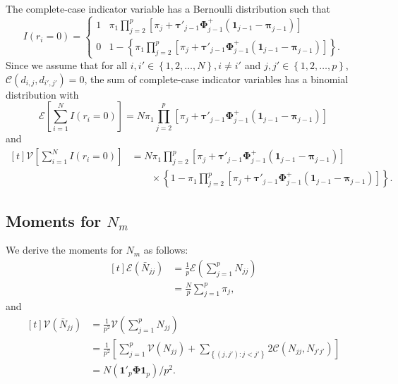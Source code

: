\documentclass[11pt]{article}
\begin{document}
The complete-case indicator variable has a Bernoulli distribution such that
\begin{equation}
I\left(r_{i}=0\right)=
\begin{cases}
1&\pi_{1}\prod_{j=2}^{p}\left[\pi_{j}+\boldsymbol{\tau}'_{j-1}\boldsymbol{\Phi}^{+}_{j-1}\left(\boldsymbol{1}_{j-1}-\boldsymbol{\pi}_{j-1}\right)\right]\\
0&1-\left\{\pi_{1}\prod_{j=2}^{p}\left[\pi_{j}+\boldsymbol{\tau}'_{j-1}\boldsymbol{\Phi}^{+}_{j-1}\left(\boldsymbol{1}_{j-1}-\boldsymbol{\pi}_{j-1}\right)\right]\right\}.
\end{cases}
\end{equation}
Since we assume that for all $i,i'\in\left\{1,2,\ldots,N\right\},i\neq i'$ and $j,j'\in\left\{1,2,\ldots,p\right\}$, $\mathcal{C}\left(d_{i,j},d_{i',j'}\right)=0$, the sum of complete-case indicator variables has a binomial distribution with 
\begin{equation}
\mathcal{E}\left[\sum_{i=1}^{N}I\left(r_{i}=0\right)\right]=N\pi_{1}\prod_{j=2}^{p}\left[\pi_{j}+\boldsymbol{\tau}'_{j-1}\boldsymbol{\Phi}^{+}_{j-1}\left(\boldsymbol{1}_{j-1}-\boldsymbol{\pi}_{j-1}\right)\right]
\end{equation}
and
\begin{equation}
\begin{aligned}[t]
\mathcal{V}\left[\sum_{i=1}^{N}I\left(r_{i}=0\right)\right]&=N\pi_{1}\prod_{j=2}^{p}\left[\pi_{j}+\boldsymbol{\tau}'_{j-1}\boldsymbol{\Phi}^{+}_{j-1}\left(\boldsymbol{1}_{j-1}-\boldsymbol{\pi}_{j-1}\right)\right]\\
&\qquad\times\left\{1-\pi_{1}\prod_{j=2}^{p}\left[\pi_{j}+\boldsymbol{\tau}'_{j-1}\boldsymbol{\Phi}^{+}_{j-1}\left(\boldsymbol{1}_{j-1}-\boldsymbol{\pi}_{j-1}\right)\right]\right\}.
\end{aligned}
\end{equation}

\subsection{Moments for $N_m$}

We derive the moments for $N_{m}$ as follows:
\begin{equation}
\begin{aligned}[t]
\mathcal{E}(\bar{N}_{jj})&=\frac{1}{p}\mathcal{E}\left(\sum_{j=1}^{p}N_{jj}\right)\\
&=\frac{N}{p}\sum_{j=1}^{p}\pi_{j},
\end{aligned}
\end{equation}
and
\begin{equation}
\begin{aligned}[t]
\mathcal{V}(\bar{N}_{jj})&=\frac{1}{p^{2}}\mathcal{V}\left(\sum_{j=1}^{p}N_{jj}\right)\\
&=\frac{1}{p^{2}}\left[\sum_{j=1}^{p}\mathcal{V}\left(N_{jj}\right)+\sum_{\left\{\left(j,j'\right):j<j'\right\}}2\mathcal{C}\left(N_{jj},N_{j'j'}\right)%
\right]\\
&=N\left(\boldsymbol{1}'_{p}\boldsymbol{\Phi 1}_{p}\right)/p^{2}.
\end{aligned}
\end{equation}
\end{document}
